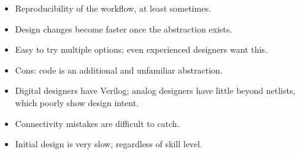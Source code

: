 \begin{frame}
{\begin{itemize}
    \item Reproducibility of the workflow, at least sometimes.
    \item Design changes become faster once the abstraction exists.
    \item Easy to try multiple options; even experienced designers want this.
    \item Cons: code is an additional and unfamiliar abstraction.
    \item Digital designers have Verilog; analog designers have little beyond netlists, which poorly show design intent.
    \item Connectivity mistakes are difficult to catch.
    \item Initial design is very slow, regardless of skill level.
  \end{itemize}}
\end{frame}

